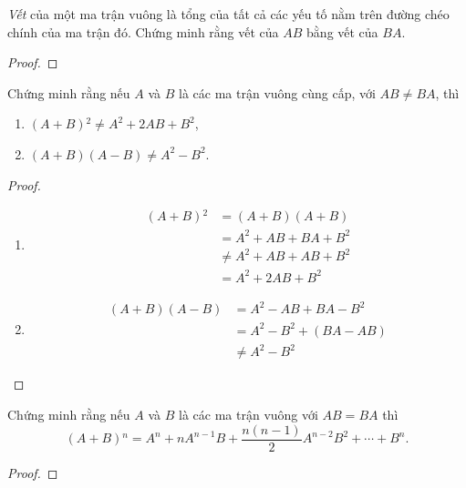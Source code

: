 \documentclass[class=linearalgebra,crop=false]{standalone}
\begin{document}
\begin{exercise}
    \textit{Vết} của một ma trận vuông là tổng của tất cả các yếu tố nằm trên đường chéo chính của ma trận đó. Chứng minh rằng vết của $AB$ bằng vết của $BA$.
\end{exercise}

\begin{proof}
\end{proof}

\begin{exercise}
    Chứng minh rằng nếu $A$ và $B$ là các ma trận vuông cùng cấp, với $AB\ne BA$, thì
    \begin{enumerate}[label = (\alph*)]
        \item $(A+B){}^{2}\ne A^{2} + 2AB + B^{2}$,
        \item $(A+B)(A-B)\ne A^{2} - B^{2}$.
    \end{enumerate}
\end{exercise}

\begin{proof}
    \begin{enumerate}[label = (\alph*)]
        \item
             \begin{align*}
                 (A+B){}^{2} & = (A+B)(A+B) \\
                             & = A^{2} + AB + BA + B^{2} \\
                             & \ne A^{2} + AB + AB + B^{2} \\
                             & = A^{2} + 2AB + B^{2}
             \end{align*}
        \item
             \begin{align*}
                 (A+B)(A-B) & = A^{2} - AB + BA - B^{2} \\
                            & = A^{2} - B^{2} + (BA - AB) \\
                            & \ne A^{2} - B^{2}
             \end{align*}
    \end{enumerate}
\end{proof}

\begin{exercise}
    Chứng minh rằng nếu $A$ và $B$ là các ma trận vuông với $AB = BA$ thì
    \[
        (A+B){}^{n} = A^{n} + nA^{n-1}B + \frac{n(n-1)}{2}A^{n-2}B^{2} + \cdots + B^{n}.
    \]
\end{exercise}

\begin{proof}
\end{proof}
\end{document}
